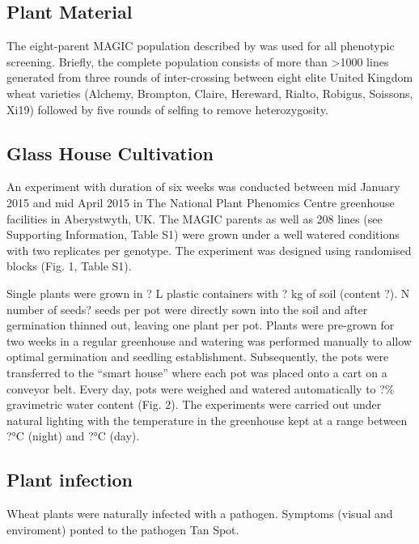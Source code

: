 \documentclass{frontiersSCNS} %
\begin{document}
\subsection{Plant Material}
The eight-parent MAGIC population described by \cite{Mackay01092014} was used for all phenotypic screening. Briefly, the complete population consists of more than >1000 lines generated from three rounds of inter-crossing between eight elite United Kingdom wheat varieties (Alchemy, Brompton, Claire, Hereward, Rialto, Robigus, Soissons, Xi19) followed by five rounds of selfing to remove heterozygosity. 

\subsection{Glass House Cultivation}
An experiment with duration of six weeks was conducted between mid January 2015 and mid April 2015 in The National Plant Phenomics Centre greenhouse facilities in Aberystwyth, UK. The MAGIC parents as well as 208 lines (see Supporting Information, Table S1) were grown under a well watered conditions with two replicates per genotype. The experiment was designed using randomised blocks (Fig. 1, Table S1).

Single plants were grown in ? L plastic containers with ? kg of soil (content ?). N number of seeds? seeds per pot were directly sown into the soil and after germination thinned out, leaving one plant per pot. Plants were pre-grown for two weeks in a regular greenhouse and watering was performed manually to allow optimal germination and seedling establishment. Subsequently, the pots were transferred to the “smart house” where each pot was placed onto a cart on a conveyor belt. Every day, pots were weighed and watered automatically to ?\% gravimetric water content (Fig. 2). The experiments were carried out under natural lighting with the temperature in the greenhouse kept at a range between ?°C (night) and ?°C (day).

\subsection{Plant infection}
Wheat plants were naturally infected with a pathogen. Symptoms (visual and enviroment) ponted to the pathogen Tan Spot.
\end{document}
